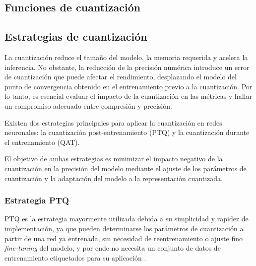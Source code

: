 

\subsection{Funciones de cuantización}
\label{sec:funciones_de_cuantizacion}



\subsection{Estrategias de cuantización}
La cuantización reduce el tamaño del modelo, la memoria requerida y acelera la inferencia. No obstante, la reducción de la precisión numérica introduce un error de cuantización que puede afectar el rendimiento, desplazando el modelo del punto de convergencia obtenido en el entrenamiento previo a la cuantización. Por lo tanto, es esencial evaluar el impacto de la cuantización en las métricas y hallar un compromiso adecuado entre compresión y precisión.

Existen dos estrategias principales para aplicar la cuantización en redes neuronales: la cuantización post-entrenamiento (PTQ) y la cuantización durante el entrenamiento (QAT).

El objetivo de ambas estrategias es minimizar el impacto negativo de la cuantización en la precisión del modelo mediante el ajuste de los parámetros de cuantización y la adaptación del modelo a la representación cuantizada.

\subsubsection{Estrategia PTQ}
PTQ es la estrategia mayormente utilizada debida a su simplicidad y rapidez de implementación, ya que pueden determinarse los parámetros de cuantización a partir de una red ya entrenada, sin necesidad de reentrenamiento o ajuste fino \textit{fine-tuning} del modelo, y por ende no necesita un conjunto de datos de entrenamiento etiquetados para su aplicación \cite{gholami2021surveyquantizationmethodsefficient}.

